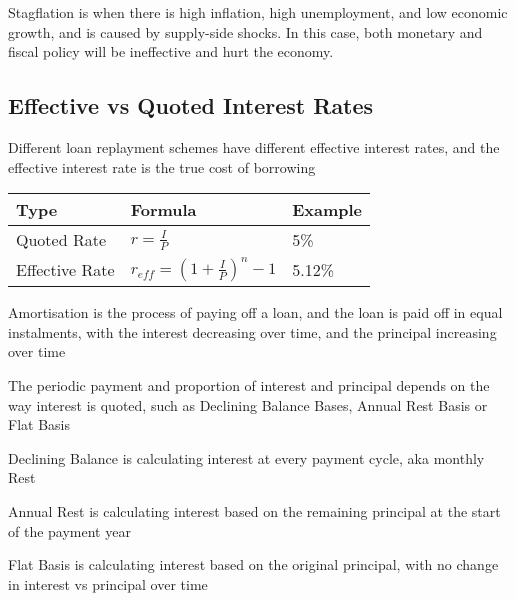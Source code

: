 Stagflation is when there is high inflation, high unemployment, and low economic growth, and is caused by supply-side shocks. In this case,
both monetary and fiscal policy will be ineffective and hurt the economy.

\subsection{Effective vs Quoted Interest Rates}
Different loan replayment schemes have different effective interest rates, and the effective interest rate is the true cost of borrowing

\begin{tabularx}{\linewidth}{|X|X|X|}
\hline 
\textbf{Type} & \textbf{Formula} & \textbf{Example} \\
\hline
Quoted Rate & $r = \frac{I}{P}$ & 5\% \\
\hline
Effective Rate & $r_{eff} = (1 + \frac{I}{P})^n - 1$ & 5.12\% \\
\hline
\end{tabularx}

Amortisation is the process of paying off a loan, and the loan is paid off in equal instalments, with the interest decreasing over time, and the principal increasing over time

The periodic payment and proportion of interest and principal depends on the way interest is quoted, such as Declining Balance Bases, Annual Rest Basis or Flat Basis

Declining Balance is calculating interest at every payment cycle, aka monthly Rest

Annual Rest is calculating interest based on the remaining principal at the start of the payment year

Flat Basis is calculating interest based on the original principal, with no change in interest vs principal over time

